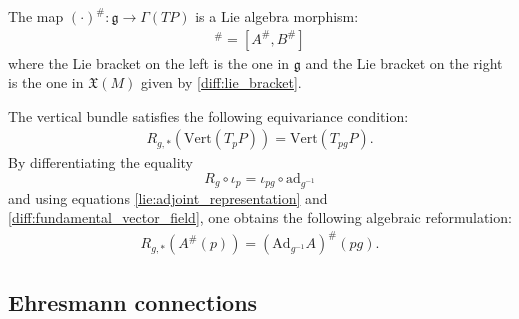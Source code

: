 
    \begin{property}
        The map $(\cdot)^\#:\mathfrak{g}\rightarrow\Gamma(TP)$ is a Lie algebra morphism:
        \begin{gather}
            [A,B]^\# = [A^\#,B^\#]
        \end{gather}
        where the Lie bracket on the left is the one in $\mathfrak{g}$ and the Lie bracket on the right is the one in $\mathfrak{X}(M)$ given by \ref{diff:lie_bracket}.
    \end{property}

    \begin{property}
        The vertical bundle satisfies the following equivariance condition:
        \begin{gather}
            \label{diff:vert_g_equivariance}
            R_{g, \ast}(\text{Vert}(T_pP)) = \text{Vert}(T_{pg}P).
        \end{gather}
        By differentiating the equality \[R_g\circ\iota_p = \iota_{pg}\circ\text{ad}_{g^{-1}}\] and using equations \ref{lie:adjoint_representation} and \ref{diff:fundamental_vector_field}, one obtains the following algebraic reformulation:
        \begin{gather}
            R_{g,\ast}\left(A^\#(p)\right) = \left(\text{Ad}_{g^{-1}}A\right)^\#(pg).
        \end{gather}
    \end{property}

\subsection{Ehresmann connections}

